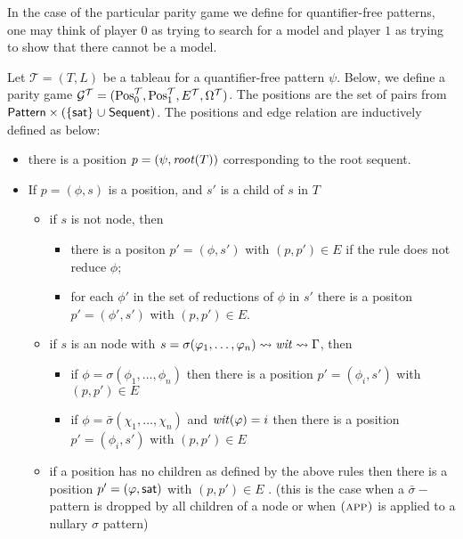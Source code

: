 

In the case of the particular parity game we define for quantifier-free patterns,
one may think of player \(0\) as trying to search for a model and player \(1\)
as trying to show that there cannot be a model.

\begin{definition}Let \(\mathcal T = (T, L)\) be a tableau for a quantifier-free pattern \(\psi\).
Below, we define a parity game \(\mathcal G^{\mathcal T} = (\mathrm{Pos}^{\mathcal T}_0, \mathrm{Pos}^{\mathcal T}_1, E^{\mathcal T}, \Omega^{\mathcal T})\).
The positions are the set of pairs from \(\textsf{Pattern} \times (\{\mathsf{sat}\} \mathrel{\cup} \mathsf{Sequent})\).
The positions and edge relation are inductively defined as below:

\begin{itemize}
\tightlist
\item
  there is a position \(p = (\psi, \mathit{root}(T))\) corresponding to the root sequent.
\item
  If \(p = (\phi, s)\) is a position, and \(s'\) is a child of \(s\) in \(T\)

  \begin{itemize}
  \tightlist
  \item
    if \(s\) is not \appc{} node, then

    \begin{itemize}
    \tightlist
    \item
      there is a positon \(p' = (\phi, s')\) with \((p, p') \in E\)
      if the rule does not reduce \(\phi\);
    \item
      for each \(\phi'\) in the set of reductions of \(\phi\) in \(s'\)
      there is a positon \(p' = (\phi', s')\) with \((p, p') \in E\).
    \end{itemize}
  \item
    if \(s\) is an \appc{} node with \(s = \sigma(\varphi_1,\ldots,\varphi_n) \leadsto \mathit{wit} \leadsto \Gamma\), then

    \begin{itemize}
    \tightlist
    \item
      if \(\phi = \sigma(\phi_1,\ldots,\phi_n)\)
      then there is a position \(p' = (\phi_i, s')\) with \((p, p') \in E\)
    \item
      if \(\phi = \bar\sigma(\chi_1,\ldots,\chi_n)\)
      and \(\mathit{wit}(\varphi) = i\)
      then there is a position \(p' = (\phi_i, s')\) with \((p, p') \in E\)
    \end{itemize}
  \item
    if a position has no children as defined by the above rules
    then there is a position \(p' = (\varphi, \mathsf{sat})\) with \((p, p') \in E\) .
    (this is the case when a \(\bar\sigma-\)pattern is dropped by all children of a \appa{} node
    or when \(\textsc{(app)}\) is applied to a nullary \(\sigma\) pattern)
  \end{itemize}
\end{itemize}


\end{definition}
